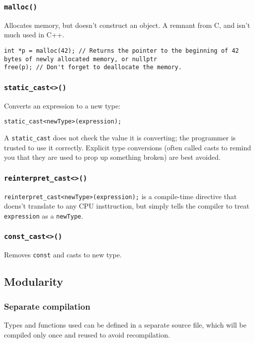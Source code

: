 \documentclass[8pt, table, xcdraw]{article}%
\begin{document}
\subsubsection{\lstinline{malloc()}}

Allocates memory, but doesn't construct an object. A remnant from C, and isn't much used in C++.

\begin{lstlisting}
int *p = malloc(42); // Returns the pointer to the beginning of 42 bytes of newly allocated memory, or nullptr
free(p); // Don't forget to deallocate the memory.
\end{lstlisting}

\subsubsection{\lstinline{static_cast<>()}} \label{staticcast}

Converts an expression to a new type:

\begin{lstlisting}
static_cast<newType>(expression);
\end{lstlisting}

A \lstinline{static_cast} does not check the value it is converting; the programmer is trusted to use it correctly. Explicit type conversions (often called casts to remind you that they are used to prop up something broken) are best avoided.

\subsubsection{\lstinline{reinterpret_cast<>()}}

\lstinline{reinterpret_cast<newType>(expression);} is a compile-time directive that doens't translate to any CPU insttruction, but simply tells the compiler to treat \lstinline{expression} as a \lstinline{newType}.

\subsubsection{\lstinline{const_cast<>()}}

Removes \lstinline{const} and casts to new type.

\subsection{Modularity}

\subsubsection{Separate compilation}
Types and functions used can be defined in a separate source file, which will be compiled only once and reused to avoid recompilation.
\end{document}
